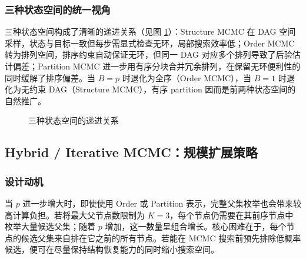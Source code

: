 \documentclass[UTF8,a4paper,12pt]{ctexart}
\begin{document}
\subsubsection{三种状态空间的统一视角}

三种状态空间构成了清晰的递进关系（见图 \ref{fig:state_spaces}）：Structure MCMC 在 DAG 空间采样，状态与目标一致但每步需显式检查无环，局部搜索效率低；Order MCMC 转为排列空间，排序约束自动保证无环，但同一 DAG 对应多个排列导致了后验估计偏差；Partition MCMC 进一步用有序分块合并冗余排列，在保留无环便利性的同时缓解了排序偏差。当 $B=p$ 时退化为全序（Order MCMC），当 $B=1$ 时退化为无约束 DAG（Structure MCMC），有序 partition 因而是前两种状态空间的自然推广。

\begin{figure}[htbp]
\centering
{}
\caption{三种状态空间的递进关系}
\label{fig:state_spaces}
\end{figure}

\subsection{Hybrid / Iterative MCMC：规模扩展策略}

\subsubsection{设计动机}

当 $p$ 进一步增大时，即使使用 Order 或 Partition 表示，完整父集枚举也会带来较高计算负担。若将最大父节点数限制为 $K=3$，每个节点仍需要在其前序节点中枚举大量候选父集；随着 $p$ 增加，这一数量呈组合增长。核心困难在于，每个节点的候选父集来自排在它之前的所有节点。若能在 MCMC 搜索前预先排除低概率候选，便可在尽量保持结构恢复能力的同时缩小搜索空间。
\end{document}
